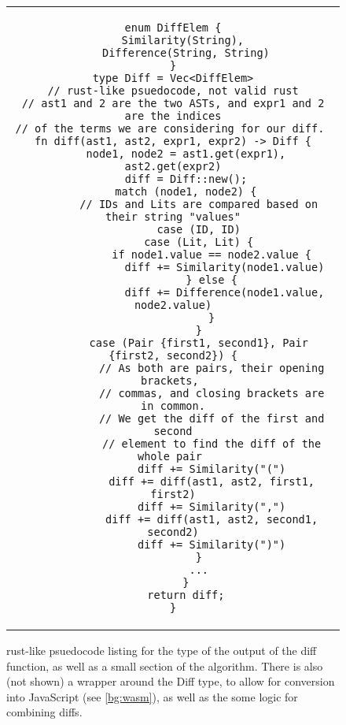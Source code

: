 \begin{figure}[t]
    \begin{tabular}{c}
    \begin{lstlisting}[language=Rust_boxed]
enum DiffElem {
    Similarity(String), 
    Difference(String, String)
}
type Diff = Vec<DiffElem>
// rust-like psuedocode, not valid rust
// ast1 and 2 are the two ASTs, and expr1 and 2 are the indices
// of the terms we are considering for our diff. 
fn diff(ast1, ast2, expr1, expr2) -> Diff {
    node1, node2 = ast1.get(expr1), ast2.get(expr2)
    diff = Diff::new();
    match (node1, node2) {
        // IDs and Lits are compared based on their string "values"
        case (ID, ID)
        case (Lit, Lit) {
            if node1.value == node2.value {
                diff += Similarity(node1.value)
            } else {
                diff += Difference(node1.value, node2.value)
            }
        }
        case (Pair {first1, second1}, Pair {first2, second2}) {
            // As both are pairs, their opening brackets, 
            // commas, and closing brackets are in common.
            // We get the diff of the first and second
            // element to find the diff of the whole pair 
            diff += Similarity("(")
            diff += diff(ast1, ast2, first1, first2)
            diff += Similarity(",")
            diff += diff(ast1, ast2, second1, second2)
            diff += Similarity(")")
        }
        ...
    }
    return diff;
}
    \end{lstlisting}
    \end{tabular}
    \caption{rust-like psuedocode listing for the type of the output of the diff function, as well as a small section of the algorithm. There is also (not shown) a wrapper around the Diff type, to allow for conversion into JavaScript (see \ref{bg:wasm}), as well as the some logic for combining diffs.}
    \label{fig:diff_list}
\end{figure}